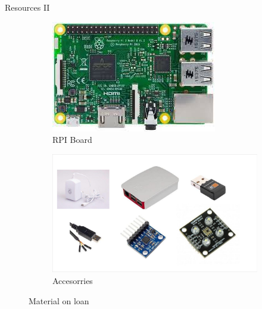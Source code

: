 \begin{frame}{Resources II}
    \begin{figure}[h]
        \centering
        \begin{subfigure}[b]{0.45\textwidth}
            \centering
            \includegraphics[width=\textwidth]{trainingmaterials/presentation/rpi.jpeg}
            \caption{RPI Board}
            \label{fig:rpi}
        \end{subfigure}
        \hfill
        \begin{subfigure}[b]{0.45\textwidth}
            \centering
            \includegraphics[width=\textwidth]{trainingmaterials/presentation/accesories.pdf}
            \caption{Accesorries}
            \label{fig:accesories}
        \end{subfigure}
        \caption{Material on loan}
        \label{fig:figures}
    \end{figure}
\end{frame}


